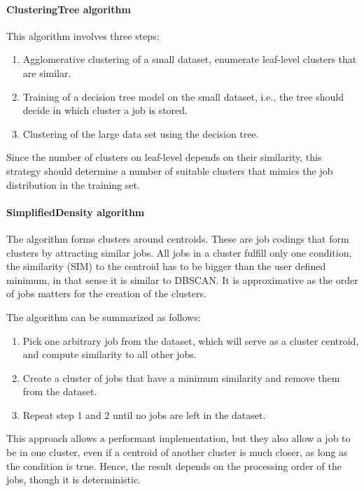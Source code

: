 \documentclass{jhps}
\begin{document}
\paragraph{ClusteringTree algorithm}
This algorithm involves three steps:

\begin{enumerate}
 \item Agglomerative clustering of a small dataset, enumerate leaf-level clusters that are similar.
 \item Training of a decision tree model on the small dataset, i.e., the tree should decide in which cluster a job is stored.
 \item Clustering of the large data set using the decision tree.
\end{enumerate}

Since the number of clusters on leaf-level depends on their similarity, this strategy should determine a number of suitable clusters that mimics the job distribution in the training set.

\paragraph{SimplifiedDensity algorithm}

The algorithm forms clusters around centroids.
These are job codings that form clusters by attracting similar jobs.
All jobs in a cluster fulfill only one condition, the similarity (SIM) to the centroid has to be bigger than the user defined minimum, in that sense it is similar to DBSCAN.
It is approximative as the order of jobs matters for the creation of the clusters.

The algorithm can be summarized as follows:
\begin{enumerate}
 \item Pick one arbitrary job from the dataset, which will serve as a cluster centroid, and compute similarity to all other jobs.
 \item Create a cluster of jobs that have a minimum similarity and remove them from the dataset.
 \item Repeat step 1 and 2 until no jobs are left in the dataset.
\end{enumerate}

This approach allows a performant implementation, but they also allow a job to be in one cluster, even if a centroid of another cluster is much closer, as long as the condition is true.
Hence, the result depends on the processing order of the jobs, though it is deterministic.
\end{document}
